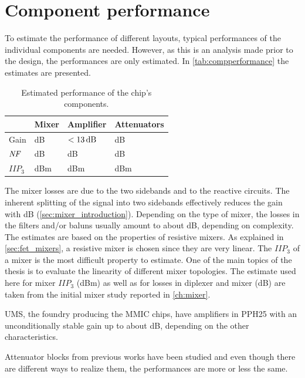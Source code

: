 	\section{Component performance}
		To estimate the performance of different layouts, typical performances of the individual components are needed. However, as this is an analysis made prior to the design, the performances are only estimated. In \autoref{tab:compperformance} the estimates are presented.

		\begin{table}[hbt!]
			\caption[Estimated performance of chip components.]{Estimated performance of the chip's components.}
			\label{tab:compperformance}
			\centering
			\begin{tabular}{ l l l l } \toprule
				& Mixer & Amplifier & Attenuators \\\midrule
				Gain & \unit[-8]{dB} & $\unit[<13]{dB}$ & \unit[-2-- -12]{dB} \\
				$\emph{NF}$ & \unit[8]{dB} & \unit[1--2]{dB} & \unit[2--12]{dB} \\
				$IIP_3$ & \unit[20--27]{dBm} & \unit[14--22]{dBm} & \unit[30]{dBm} \\\bottomrule
			\end{tabular}
		\end{table}

		The mixer losses are due to the two sidebands and to the reactive circuits. The inherent splitting of the signal into two sidebands effectively reduces the gain with \unit[3]{dB} (\autoref{sec:mixer_introduction}). Depending on the type of mixer, the losses in the filters and/or baluns usually amount to about \unit[3--7]{dB}, depending on complexity. The estimates are based on the properties of resistive mixers. As explained in \autoref{sec:fet_mixers}, a resistive mixer is chosen since they are very linear. The $IIP_3$ of a mixer is the most difficult property to estimate. One of the main topics of the thesis is to evaluate the linearity of different mixer topologies. The estimate used here for mixer $IIP_3$ (\unit[25]{dBm}) as well as for losses in diplexer and mixer (\unit[8]{dB}) are taken from the initial mixer study reported in \autoref{ch:mixer}.

		UMS, the foundry producing the MMIC chips, have amplifiers in PPH25 with an unconditionally stable gain up to about \unit[13]{dB}, depending on the other characteristics.\autocite{pph25manual}

		Attenuator blocks from previous works have been studied and even though there are different ways to realize them, the performances are more or less the same.\autocite{gustavsson07}

